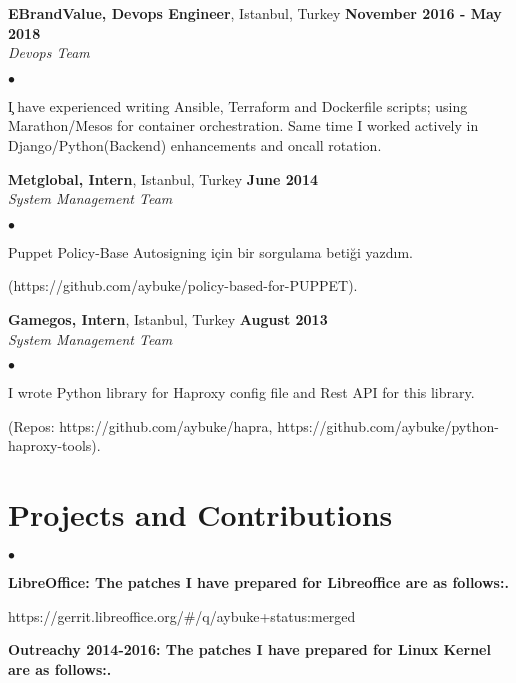 \documentclass[margin,line]{res}
\newenvironment{list2}{
  \begin{list}{$\bullet$}{%
      \setlength{\itemsep}{0in}
      \setlength{\parsep}{0in} \setlength{\parskip}{0in}
      \setlength{\topsep}{0in} \setlength{\partopsep}{0in}
      \setlength{\leftmargin}{0.1in}}}{\end{list}}
\begin{document}
\begin{resume}
{\bf EBrandValue, Devops Engineer}, Istanbul, Turkey \hfill {\bf November 2016 - May 2018}\\

\vspace{-.7cm}
{\em Devops Team}
\vspace*{+.05in}
\begin{list2}
\item \c I have experienced writing Ansible, Terraform and Dockerfile scripts; using Marathon/Mesos for container orchestration. Same time I worked actively in Django/Python(Backend) enhancements and oncall rotation.

\end{list2}

{\bf Metglobal, Intern}, Istanbul, Turkey \hfill {\bf June 2014}\\

\vspace{-.7cm}
{\em System Management Team }
\vspace*{+.05in}
\begin{list2}
\item Puppet Policy-Base Autosigning i\c{c}in bir sorgulama beti\u{g}i yazd{\i}m. 

(https://github.com/aybuke/policy-based-for-PUPPET).
\end{list2}

{\bf Gamegos, Intern}, Istanbul, Turkey \hfill {\bf August 2013}\\

\vspace{-.7cm}
{\em System Management Team}
\vspace*{+.05in}
\begin{list2}
\item I wrote Python library for Haproxy config file and Rest API for this library. 

(Repos: https://github.com/aybuke/hapra, https://github.com/aybuke/python-haproxy-tools).
\end{list2}

\section{\sc Projects and Contributions}
\begin{list2}
\item {\bf LibreOffice: The patches I have prepared for Libreoffice are as follows:.}

https://gerrit.libreoffice.org/\#/q/aybuke+status:merged
\item {\bf Outreachy 2014-2016: The patches I have prepared for Linux Kernel are as follows:.}


\end{list2}
\end{resume}
\end{document}
